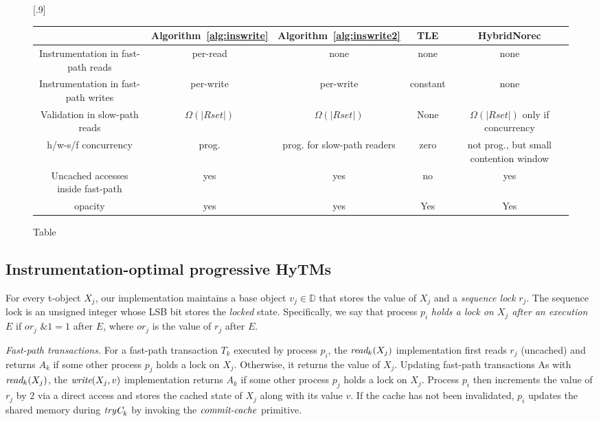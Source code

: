 
\begin{figure*}[!h]
      
     \scalebox{.9}[.9]{
     \begin{tabularx}{\textwidth}{c|c|c|c|c}
	~~~~~ & Algorithm~\ref{alg:inswrite} & Algorithm~\ref{alg:inswrite2} & TLE & HybridNorec\\ \hline
	Instrumentation in fast-path reads & per-read & none & none & none \\ \hline
	Instrumentation in fast-path writes & per-write & per-write & constant & none \\ \hline
	Validation in slow-path reads & $\Omega(|Rset|)$ & $\Omega(|Rset|)$ & None & $\Omega(|Rset|)$ only if concurrency \\ \hline
	h/w-s/f concurrency & prog. & prog. for slow-path readers & zero & not prog., but small contention window \\ \hline
	Uncached accesses inside fast-path & yes & yes & no & yes \\ \hline
	opacity & yes & yes & Yes & Yes 
   \end{tabularx}
\caption{Table}\label{fig:main}    
}
\end{figure*}
\subsection{Instrumentation-optimal progressive HyTMs }
\label{sec:hytm1}
%
For every t-object $X_j$, our implementation maintains a base object $v_j\in \mathbb{D}$ that stores the value of $X_j$
and a \emph{sequence lock} $r_{j}$. The sequence lock is an unsigned integer whose LSB bit stores the \emph{locked} state.
Specifically, we say that process $p_i$ \emph{holds a lock on $X_j$ after an execution $E$} if
$\textit{or}_j$ $\mathrel{\&} 1=1$ after $E$, where $\textit{or}_j$ is the value of $r_j$ after $E$.

\vspace{1mm}\noindent\textit{Fast-path transactions.}
For a fast-path transaction $T_k$ executed by process $p_i$, the $\textit{read}_k(X_j)$ implementation first reads $r_j$ (uncached)
and returns $A_k$ if some other process $p_j$ holds a lock on $X_j$.
Otherwise, it returns the value of $X_j$.
Updating fast-path transactions 
As with $\textit{read}_k(X_j)$, the $\textit{write} (X_j,v)$ implementation returns $A_k$ if some other process $p_j$ holds a lock on $X_j$.
Process $p_i$ then increments the value of $r_j$ by $2$ via a direct access and stores the cached state of $X_j$ along with its value $v$.
If the cache has not been invalidated, $p_i$ updates the shared memory
during $\textit{tryC}_k$ by invoking the $\ms{commit-cache}$ primitive.

